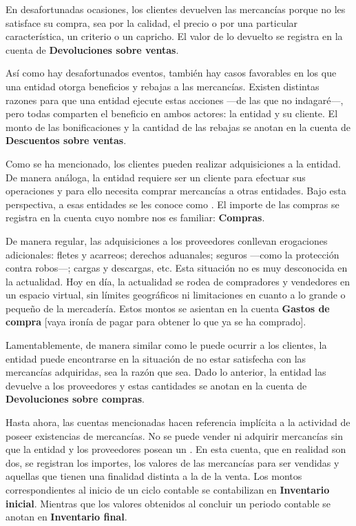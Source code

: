 \documentclass[12pt]{article}
\begin{document}
En desafortunadas ocasiones, los clientes devuelven las mercancías porque no les satisface su compra, sea por la calidad, el precio o por una particular característica, un criterio o un capricho. El valor de lo devuelto se registra en la cuenta de \textbf{Devoluciones sobre ventas}.

Así como hay desafortunados eventos, también hay casos favorables en los que una entidad otorga beneficios y rebajas a las mercancías. Existen distintas razones para que una entidad ejecute estas acciones ---de las que no indagaré---, pero todas comparten el beneficio en ambos actores: la entidad y su cliente. El monto de las bonificaciones y la cantidad de las rebajas se anotan en la cuenta de \textbf{Descuentos sobre ventas}.

Como se ha mencionado, los clientes pueden realizar adquisiciones a la entidad. De manera análoga, la entidad requiere ser un cliente para efectuar sus operaciones y para ello necesita comprar mercancías a otras entidades. Bajo esta perspectiva, a esas entidades se les conoce como . El importe de las compras se registra en la cuenta cuyo nombre nos es familiar: \textbf{Compras}.

De manera regular, las adquisiciones a los proveedores conllevan erogaciones adicionales: fletes y acarreos; derechos aduanales; seguros ---como la protección contra robos---; cargas y descargas, etc. Esta situación no es muy desconocida en la actualidad. Hoy en día, la actualidad se rodea de compradores y vendedores en un espacio virtual, sin límites geográficos ni limitaciones en cuanto a lo grande o pequeño de la mercadería. Estos montos se asientan en la cuenta \textbf{Gastos de compra} [vaya ironía de pagar para obtener lo que ya se ha comprado].

Lamentablemente, de manera similar como le puede ocurrir a los clientes, la entidad puede encontrarse en la situación de no estar satisfecha con las mercancías adquiridas, sea la razón que sea. Dado lo anterior, la entidad las devuelve a los proveedores y estas cantidades se anotan en la cuenta de \textbf{Devoluciones sobre compras}.

Hasta ahora, las cuentas mencionadas hacen referencia implícita a la actividad de poseer existencias de mercancías. No se puede vender ni adquirir mercancías sin que la entidad y los proveedores posean un . En esta cuenta, que en realidad son dos, se registran los importes, los valores de las mercancías para ser vendidas y aquellas que tienen una finalidad distinta a la de la venta. Los montos correspondientes al inicio de un ciclo contable se contabilizan en \textbf{Inventario inicial}. Mientras que los valores obtenidos al concluir un periodo contable se anotan en \textbf{Inventario final}.
\end{document}
